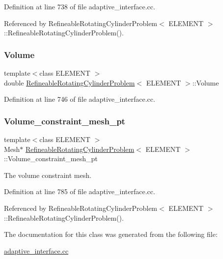 Definition at line 738 of file adaptive\+\_\+interface.\+cc.



Referenced by Refineable\+Rotating\+Cylinder\+Problem$<$ E\+L\+E\+M\+E\+N\+T $>$\+::\+Refineable\+Rotating\+Cylinder\+Problem().

\mbox{\label{classRefineableRotatingCylinderProblem_aa476013effb3f9a45cf1e1e2198aad14}} 
\subsubsection{\texorpdfstring{Volume}{Volume}}
{\footnotesize\ttfamily template$<$class E\+L\+E\+M\+E\+NT $>$ \\
double \hyperlink{classRefineableRotatingCylinderProblem}{Refineable\+Rotating\+Cylinder\+Problem}$<$ E\+L\+E\+M\+E\+NT $>$\+::Volume}



Definition at line 746 of file adaptive\+\_\+interface.\+cc.

\mbox{\label{classRefineableRotatingCylinderProblem_a3bb79346179cb5ef1dad280530ea24e8}} 
\subsubsection{\texorpdfstring{Volume\+\_\+constraint\+\_\+mesh\+\_\+pt}{Volume\_constraint\_mesh\_pt}}
{\footnotesize\ttfamily template$<$class E\+L\+E\+M\+E\+NT $>$ \\
Mesh$\ast$ \hyperlink{classRefineableRotatingCylinderProblem}{Refineable\+Rotating\+Cylinder\+Problem}$<$ E\+L\+E\+M\+E\+NT $>$\+::Volume\+\_\+constraint\+\_\+mesh\+\_\+pt}



The volume constraint mesh. 



Definition at line 785 of file adaptive\+\_\+interface.\+cc.



Referenced by Refineable\+Rotating\+Cylinder\+Problem$<$ E\+L\+E\+M\+E\+N\+T $>$\+::\+Refineable\+Rotating\+Cylinder\+Problem().



The documentation for this class was generated from the following file\+:\begin{DoxyCompactItemize}
\item 
\hyperlink{adaptive__interface_8cc}{adaptive\+\_\+interface.\+cc}\end{DoxyCompactItemize}
